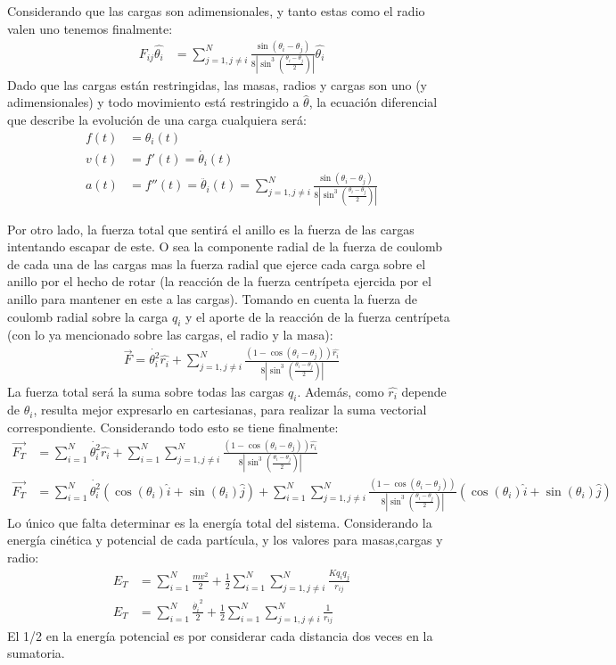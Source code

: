 \documentclass[12pt]{article}
\begin{document}
Considerando que las cargas son adimensionales, y tanto estas como el radio valen uno tenemos finalmente:
\begin{align*}
F_{ij}\hat{\theta_i}&=\sum_{j=1,j\neq i}^N \frac{\sin(\theta_i-\theta_j)}{8\left|\sin^3\left(\frac{\theta_i-\theta_j}{2}\right)\right|}\hat{\theta_i}
\end{align*}
Dado que las cargas están restringidas, las masas, radios y cargas son uno (y adimensionales) y todo movimiento está restringido a $\hat{\theta}$, la ecuación diferencial que describe la evolución de una carga cualquiera será:
\begin{align}
\label{aceler_tetha}
f(t)&=\theta_i(t) \nonumber \\
v(t)&=f'(t)=\dot{\theta_i}(t)\nonumber \\
a(t)&=f''(t)=\ddot{\theta_i}(t)=\sum_{j=1,j\neq i}^N \frac{\sin(\theta_i-\theta_j)}{8\left|\sin^3\left(\frac{\theta_i-\theta_j}{2}\right)\right|}
\end{align}

Por otro lado, la fuerza total que sentirá el anillo es la fuerza de las cargas intentando escapar de este. O sea la componente radial de la fuerza de coulomb de cada una de las cargas mas la fuerza radial que ejerce cada carga sobre el anillo por el hecho de rotar (la reacción de la fuerza centrípeta ejercida por el anillo para mantener en este a las cargas). Tomando en cuenta la fuerza de coulomb radial sobre la carga $q_i$ y el aporte de la reacción de la fuerza centrípeta (con lo ya mencionado sobre las cargas, el radio y la masa):
\begin{align*}
\vec{F}=\dot{\theta_i^2}\hat{r_i}+\sum_{j=1,j\neq i}^N \frac{(1-\cos(\theta_i-\theta_j))\hat{r_i}}{8\left|\sin^3\left(\frac{\theta_i-\theta_j}{2}\right)\right|}
\end{align*}
La fuerza total será la suma sobre todas las cargas $q_i$. Además, como $\hat{r_i}$ depende de $\theta_i$, resulta mejor expresarlo en cartesianas, para realizar la suma vectorial correspondiente. Considerando todo esto se tiene finalmente:
\begin{align}
\label{f_anillo}
\vec{F_T}&=\sum_{i=1}^N\dot{\theta_i^2}\hat{r_i}+\sum_{i=1}^N\sum_{j=1,j\neq i}^N \frac{(1-\cos(\theta_i-\theta_j))\hat{r_i}}{8\left|\sin^3\left(\frac{\theta_i-\theta_j}{2}\right)\right|} \nonumber \\
\vec{F_T}&=\sum_{i=1}^N\dot{\theta_i^2}(\cos(\theta_i)\hat{i}+\sin(\theta_i)\hat{j})+\sum_{i=1}^N\sum_{j=1,j\neq i}^N \frac{(1-\cos(\theta_i-\theta_j))}{8\left|\sin^3\left(\frac{\theta_i-\theta_j}{2}\right)\right|}(\cos(\theta_i)\hat{i}+\sin(\theta_i)\hat{j})
\end{align} 
Lo único que falta determinar es la energía total del sistema. Considerando la energía cinética y potencial de cada partícula, y los valores para masas,cargas y radio:
\begin{align}
\label{energia}
E_T&=\sum_{i=1}^N\frac{mv^2}{2}+\frac{1}{2}\sum_{i=1}^N\sum_{j=1,j\neq i}^N\frac{Kq_iq_j}{r_{ij}} \nonumber \\
E_T&=\sum_{i=1}^N\frac{\dot{\theta_i}^2}{2}+\frac{1}{2}\sum_{i=1}^N\sum_{j=1,j\neq i}^N\frac{1}{r_{ij}}
\end{align}
El 1/2 en la energía potencial es por considerar cada distancia dos veces en la sumatoria.
\end{document}
